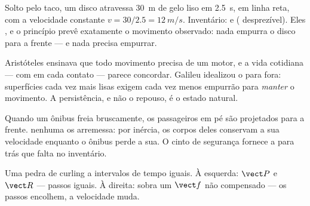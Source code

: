 \begin{example}\label{ex:g10:inertia:puck}
Solto pelo taco, um disco atravessa \qty{30}{m} de gelo liso em
\qty{2.5}{s}, em linha reta, com a velocidade constante
$v = 30/2.5 = \qty{12}{m/s}$. Inventário:  e  (
desprezível). Eles , e o princípio prevê exatamente o
movimento observado: nada empurra o disco para a frente --- e nada
precisa empurrar.
\end{example}

\begin{remark}
Aristóteles ensinava que todo movimento precisa de um motor, e a vida
cotidiana --- com  em cada contato --- parece concordar. Galileu
idealizou o  para fora: superfícies cada vez mais lisas exigem cada
vez menos empurrão para \emph{manter} o movimento. A persistência, e não
o repouso, é o estado natural.
\end{remark}

\begin{remark}
Quando um ônibus freia bruscamente, os passageiros em pé são projetados
para a frente.  nenhuma os arremessa: por inércia, os corpos deles
conservam a sua velocidade enquanto o ônibus perde a sua. O cinto de
segurança fornece a  para trás que falta no inventário.
\end{remark}

\begin{omfigure}
\qquad
{}

{\small Uma pedra de curling a intervalos de tempo iguais. À esquerda:
$\vect P$ e $\vect R$  --- passos iguais. À direita: sobra um
 $\vect f$ não compensado --- os passos encolhem, a velocidade
muda.}
\end{omfigure}

